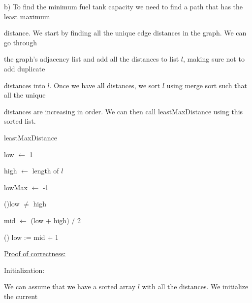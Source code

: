 \documentclass{article} %
\begin{document}
    \newpage

    b) To find the minimum fuel tank capacity we need to find a path that has the least maximum 
    
    distance. We start by finding all the unique edge distances in the graph. We can go through 
    
    the graph's adjacency list and add all the distances to list $l$, making sure not to add duplicate 
    
    distances into $l$. Once we have all distances, we sort $l$ using merge sort such that all the unique 
    
    distances are increasing in order. We can then call leastMaxDistance using this sorted list.
    

    \begin{algorithm}
        \caption{leastMaxDistance}



        low $\leftarrow$ 1
        
        high $\leftarrow$ length of $l$

        lowMax $\leftarrow$ -1

        \While(){low $\neq$ high}{
            mid $\leftarrow$ (low + high) / 2

            \Else(){
                low := mid + 1
            }
        }

    
    \end{algorithm}

    \underline{Proof of correctness:}

    Initialization:

    \hspace{5pt} We can assume that we have a sorted array $l$ with all the distances. We initialize the current 
    
\end{document}
